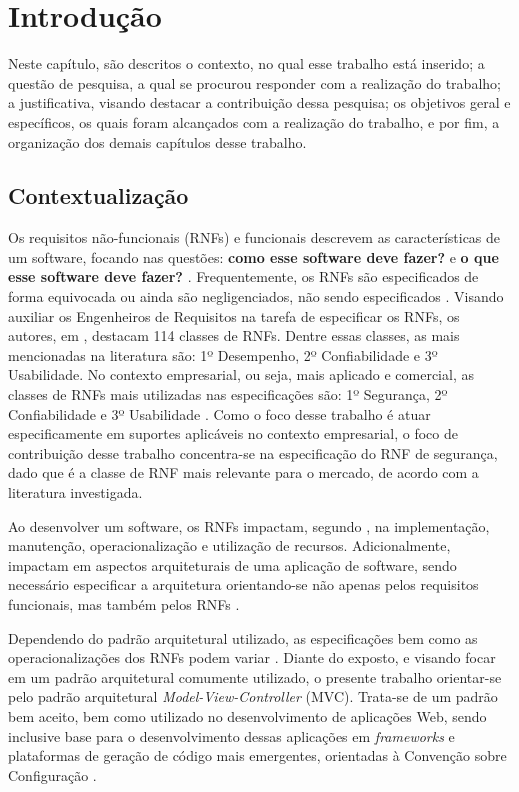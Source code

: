 \chapter{Introdução}
\label{chap:introducao}

Neste capítulo, são descritos o contexto, no qual esse trabalho está inserido; a questão de pesquisa,  a qual se procurou responder com a realização do trabalho; a justificativa, visando destacar a contribuição dessa pesquisa; os objetivos geral e específicos, os quais foram alcançados com a realização do trabalho, e por fim, a organização dos demais capítulos desse trabalho.

\section{Contextualização}

Os requisitos não-funcionais (RNFs) e funcionais descrevem as características de um software, focando nas questões: \textbf{como esse software deve fazer?} e \textbf{o que esse software deve fazer?}  \cite{sommerville1997requirements}. Frequentemente, os RNFs são especificados de forma equivocada ou ainda são negligenciados, não sendo especificados \cite{eckhardt2016non}. Visando auxiliar os Engenheiros de Requisitos na tarefa de especificar os RNFs, os autores, em \cite{mairiza2010investigation}, destacam 114 classes de RNFs. Dentre essas classes, as mais mencionadas na literatura são: 1º Desempenho, 2º Confiabilidade e  3º Usabilidade. No contexto empresarial, ou seja, mais aplicado e comercial, as classes de RNFs mais utilizadas nas especificações são: 1º Segurança, 2º Confiabilidade e 3º Usabilidade \cite{eckhardt2016non}. Como o foco desse trabalho é atuar especificamente em suportes aplicáveis no contexto empresarial, o foco de contribuição desse trabalho concentra-se na especificação do RNF de segurança, dado que é a classe de RNF mais relevante para o mercado, de acordo com a literatura investigada.

Ao desenvolver um software, os RNFs impactam, segundo \cite{eckhardt2016non}, na implementação, manutenção, operacionalização e utilização de recursos. Adicionalmente, impactam em aspectos arquiteturais de uma aplicação de software, sendo necessário especificar a arquitetura orientando-se não apenas pelos requisitos funcionais, mas também pelos RNFs \cite{buschmann1996system}.

Dependendo do padrão arquitetural utilizado, as especificações bem como as operacionalizações dos RNFs podem variar \cite{chung2012non}. Diante do exposto, e visando focar em um padrão arquitetural comumente utilizado, o presente trabalho orientar-se pelo padrão arquitetural \textit{Model-View-Controller} (MVC). Trata-se de um padrão bem aceito, bem como utilizado no desenvolvimento de aplicações Web, sendo inclusive base para o desenvolvimento dessas aplicações em \textit{frameworks} e plataformas de geração de código mais emergentes, orientadas à Convenção sobre Configuração \cite{jailia2016behavior}.


